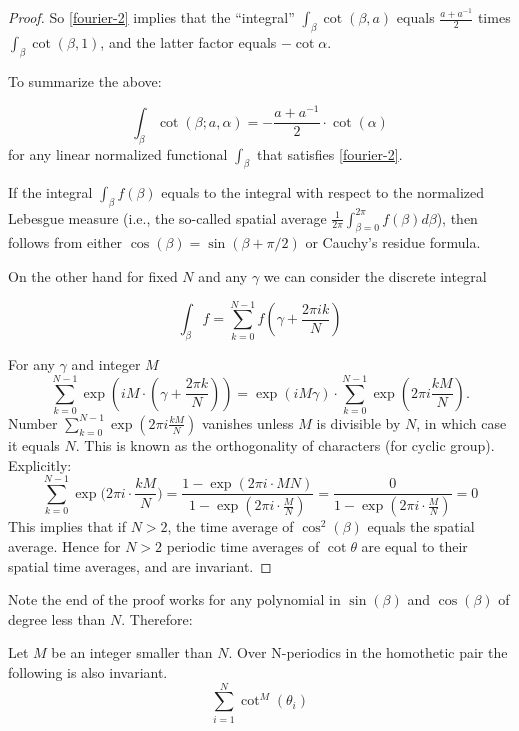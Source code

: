 \begin{proof}
So \cref{fourier-2} implies that the ``integral'' $\int_\beta \cot(\beta,a)$
equals $\frac{a+a^{-1}}{2}$ times  $\int_\beta \cot(\beta,1)$, and the latter factor equals $-\cot \alpha$.

To summarize the above:

\begin{equation} \label{space-average}
\int_\beta  \cot(\beta;a,\alpha)  = - \frac{a+a^{-1}}{2} \cdot \cot(\alpha)
\end{equation}
for any linear normalized functional $\int_\beta$ that satisfies \cref{fourier-2}.

If the integral $\int_\beta f(\beta)$ equals to the integral with respect to the normalized Lebesgue measure
(i.e., the so-called spatial average $\frac1{2\pi} \int_{\beta=0}^{2\pi} f(\beta) d\beta$),
then  
follows from either $\cos(\beta)=\sin(\beta+\pi/2)$ or Cauchy's residue formula.

On the other hand for fixed $N$ and any $\gamma$ we can consider the discrete integral

\[ \int_\beta f = \sum_{k=0}^{N-1} f(\gamma + \frac{2\pi i k}{N}) \]

For any $\gamma$ and integer $M$
\[ \sum_{k=0}^{N-1} \exp(i M \cdot (\gamma +\frac{2\pi k}{N}))
= \exp(i M \gamma) \cdot \sum_{k=0}^{N-1} \exp(2\pi i\frac{k M}{N}). \]
Number $\sum_{k=0}^{N-1} \exp(2\pi i\frac{k M}{N})$ vanishes unless $M$ is divisible by $N$,
in which case it equals $N$. 
This is known as the orthogonality of characters (for cyclic group). Explicitly:
\[ 
\sum_{k=0}^{N-1} \exp\big(2\pi i\cdot \frac{kM}{N}\big) 
= \frac{1-\exp(2\pi i\cdot MN)}{1-\exp(2\pi i\cdot\frac{M}{N})} 
= \frac0{1-\exp(2\pi i\cdot\frac{M}{N})} = 0 
\]
%
%
This implies that if $N>2$, the time average of $\cos^2(\beta)$ equals the spatial average.
Hence for $N>2$ periodic time averages of $\cot\theta$ are equal to their spatial time averages, and are invariant.
\end{proof}

Note the end of the proof works for any polynomial in $\sin(\beta)$ and $\cos(\beta)$
of degree less than $N$. Therefore: 

\begin{corollary}
Let $M$ be an integer smaller than $N$. Over N-periodics in the homothetic pair the following is also invariant.
\[\sum_{i=1}^{N}{\cot^M(\theta_i)}\] \end{corollary}

